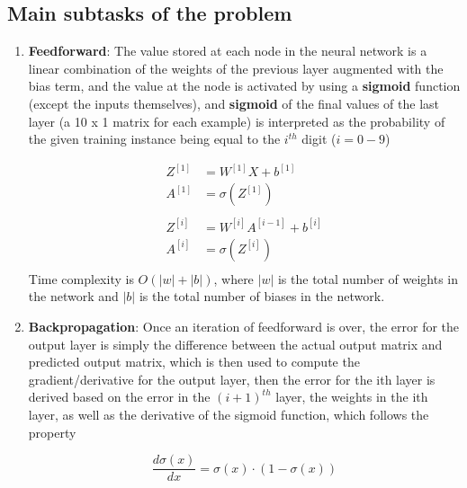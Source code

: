 \documentclass{article}
\begin{document}
\subsection{Main subtasks of the problem}
\begin{enumerate}
	\item \textbf{Feedforward}: The value stored at each node in the neural network is a linear combination of the weights of  the previous layer 
	      augmented with the bias term, and the value at the node is activated by using a \textbf{sigmoid} function (except the inputs themselves), 
	      and \textbf{sigmoid} of the final values of the last layer (a 10 x 1 matrix for each example)  is interpreted as the probability of the 
	      given training instance being equal to the $i^{th}$ digit ($i = 0-9$)
	      	      							
	      \begin{align*}
	      	Z^{[1]} & = W^{[1]}X + b^{[1]}         \\
	      	A^{[1]} & = \sigma(Z^{[1]})            \\ \\
	      	Z^{[i]} & = W^{[i]}A^{[i-1]} + b^{[i]} \\
	      	A^{[i]} & = \sigma(Z^{[i]})            \\
	      \end{align*}
	      Time complexity is $O(|w|+|b|)$, where $|w|$ is the total number of weights in the network and $|b|$ is the total number of biases 
	      in the network.
	      	      	      	      	      	      
	\item \textbf{Backpropagation}: Once an iteration of feedforward is over, the error for the output layer is simply the difference between the 
	      actual output matrix and predicted output matrix, which is then used to compute the gradient/derivative for the output layer, then the 
	      error for the ith layer is derived based on the error in the $(i+1)^{th}$ layer, the weights in the ith layer, as well as the derivative
	      of the sigmoid function, which follows the property
	      	      	      	      	      	      
	      $$
	      \frac{d\sigma(x)}{dx} = \sigma(x) \cdot (1-\sigma(x))
	      $$
	      	      	      	      	      	      

\end{enumerate}
\end{document}
